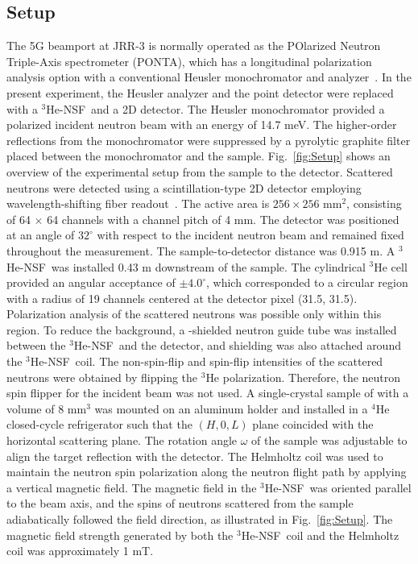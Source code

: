 \documentclass[%
 reprint,
superscriptaddress,
 amsmath,amssymb,
 aps,
floatfix,
]{revtex4-2}
\newcommand{\He}{$^3$He }
\newcommand{\Hensf}{$^3$He-NSF}
\begin{document}
\subsection{Setup}
The 5G beamport at JRR-3 is normally operated as the POlarized Neutron Triple-Axis spectrometer (PONTA), which has a longitudinal polarization analysis option with a conventional Heusler monochromator and analyzer~\cite{nakajima_polarized_2024}.
In the present experiment, the Heusler analyzer and the point detector were replaced with a \Hensf\ and a 2D detector.
The Heusler monochromator provided a polarized incident neutron beam with an energy of 14.7 meV.
The higher-order reflections from the monochromator were suppressed by a pyrolytic graphite filter placed between the monochromator and the sample.
Fig.~\ref{fig:Setup} shows an overview of the experimental setup from the sample to the detector.
Scattered neutrons were detected using a scintillation-type 2D detector employing wavelength-shifting fiber readout~\cite{nakamura_large-area_2012}.
The active area is \(256 \times 256\) mm$^2$, consisting of 64 $\times$ 64 channels with a channel pitch of 4 mm.
The detector was positioned at an angle of \(32^\circ\) with respect to the incident neutron beam and remained fixed throughout the measurement.
The sample-to-detector distance was 0.915 m.
A \Hensf~was installed 0.43 m downstream of the sample.
The cylindrical \He cell provided an angular acceptance of \(\pm4.0^\circ\), which corresponded to a circular region with a radius of 19 channels centered at the detector pixel (31.5, 31.5).
Polarization analysis of the scattered neutrons was possible only within this region.
To reduce the background, a -shielded neutron guide tube was installed between the \Hensf~and the detector, and  shielding was also attached around the \Hensf~coil.
The non-spin-flip and spin-flip intensities of the scattered neutrons were obtained by flipping the \He polarization.
Therefore, the neutron spin flipper for the incident beam was not used.
A single-crystal sample of  with a volume of 8 mm$^3$ was mounted on an aluminum holder and installed in a $^4$He closed-cycle refrigerator such that the $(H,0,L)$ plane coincided with the horizontal scattering plane.
The rotation angle $\omega$ of the sample was adjustable to align the target reflection with the detector.
The Helmholtz coil was used to maintain the neutron spin polarization along the neutron flight path by applying a vertical magnetic field.
The magnetic field in the \Hensf~was oriented parallel to the beam axis, and the spins of neutrons scattered from the sample adiabatically followed the field direction, as illustrated in Fig.~\ref{fig:Setup}.
The magnetic field strength generated by both the \Hensf~coil and the Helmholtz coil was approximately 1 mT.
\end{document}
